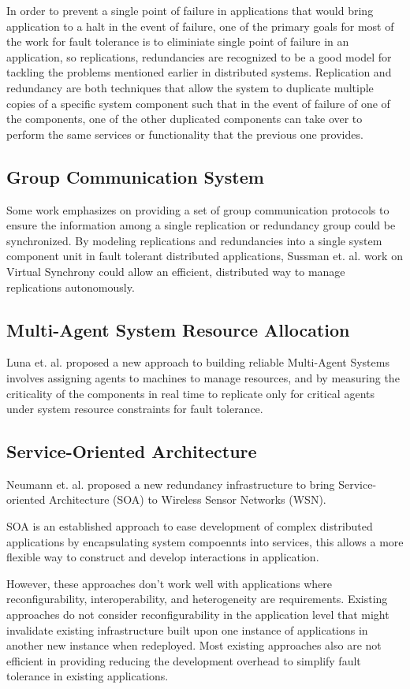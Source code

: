 In order to prevent a single point of failure in applications that would bring
application to a halt in the event of failure, 
one of the primary goals for most of the work for fault tolerance is to
eliminiate single
point of failure in an application, so replications, redundancies are
recognized to be a good model for tackling the problems mentioned earlier in
distributed systems.
Replication and redundancy are both techniques that allow the system to
duplicate multiple copies of a specific system component such that in the
event of failure of one of the components, one of the other duplicated
components can take over to perform the same services or functionality that the
previous one provides.

\subsection{Group Communication System}

Some work emphasizes on providing a set of group communication protocols to
ensure the information among a single replication or redundancy group could be
synchronized\cite{Sussman2000}. By modeling replications and redundancies into
a single system component unit in fault tolerant distributed applications, 
Sussman et. al. work on Virtual Synchrony could allow an efficient, distributed
way to manage replications autonomously.

\subsection{Multi-Agent System Resource Allocation}

Luna et. al.\cite{Luna2008} proposed a new approach to building reliable
Multi-Agent Systems involves assigning agents to machines to manage resources,
and by measuring the criticality of the components in real time to replicate
only for critical agents under system resource constraints for fault tolerance.

\subsection{Service-Oriented Architecture}

Neumann et. al.\cite{Neumann2010} proposed a new redundancy infrastructure to
bring Service-oriented Architecture (SOA) to Wireless Sensor Networks (WSN).

SOA is an established approach to ease development of complex distributed
applications by encapsulating system compoennts into services, this allows a more
flexible way to construct and develop interactions in application.

However, these approaches don't work well with applications where
reconfigurability, interoperability, and heterogeneity are requirements.
Existing approaches do not consider reconfigurability in the
application level that might invalidate existing infrastructure built upon one
instance of applications in another new instance when redeployed.
Most existing approaches also are not efficient in providing reducing the
development overhead to simplify fault tolerance in existing applications.
